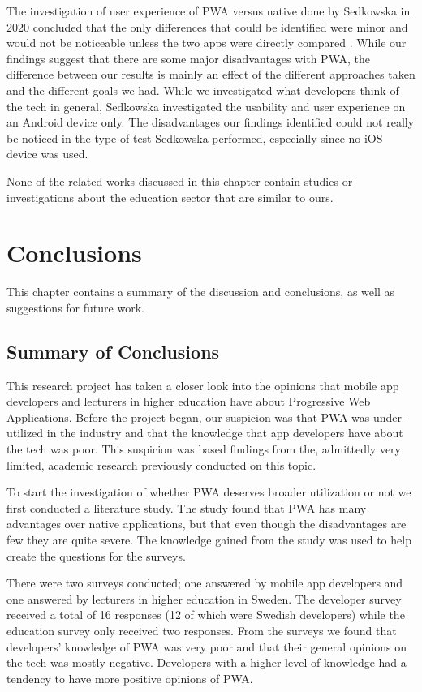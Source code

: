 \documentclass[a4paper,12pt]{article}
\begin{document}
The investigation of user experience of PWA versus native done by Sedkowska in 2020 concluded that the only differences that could be identified were minor and would not be noticeable unless the two apps were directly compared \cite{thesis_pwa_ux}. While our findings suggest that there are some major disadvantages with PWA, the difference between our results is mainly an effect of the different approaches taken and the different goals we had. While we investigated what developers think of the tech in general, Sedkowska investigated the usability and user experience on an Android device only. The disadvantages our findings identified could not really be noticed in the type of test Sedkowska performed, especially since no iOS device was used.

None of the related works discussed in this chapter contain studies or investigations about the education sector that are similar to ours.

\newpage

\section{Conclusions}
\label{Conclusions}
This chapter contains a summary of the discussion and conclusions, as well as suggestions for future work.

\subsection{Summary of Conclusions}
\label{Conclusions_summary}
This research project has taken a closer look into the opinions that mobile app developers and lecturers in higher education have about Progressive Web Applications. Before the project began, our suspicion was that PWA was under-utilized in the industry and that the knowledge that app developers have about the tech was poor. This suspicion was based findings from the, admittedly very limited, academic research previously conducted on this topic.

To start the investigation of whether PWA deserves broader utilization or not we first conducted a literature study. The study found that PWA has many advantages over native applications, but that even though the disadvantages are few they are quite severe. The knowledge gained from the study was used to help create the questions for the surveys.

There were two surveys conducted; one answered by mobile app developers and one answered by lecturers in higher education in Sweden. The developer survey received a total of 16 responses (12 of which were Swedish developers) while the education survey only received two responses. From the surveys we found that developers' knowledge of PWA was very poor and that their general opinions on the tech was mostly negative. Developers with a higher level of knowledge had a tendency to have more positive opinions of PWA.
\end{document}
